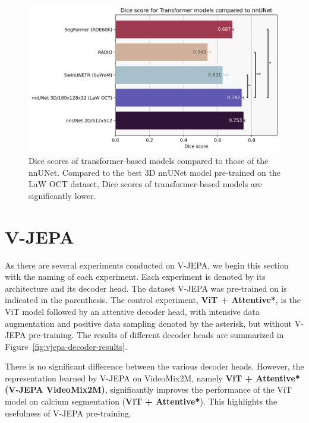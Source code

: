 \documentclass[a4paper,11pt,oneside]{report}
\begin{document}
\begin{figure}[hbt]
    \centering
    \includegraphics[width=0.6\linewidth]{figures/result_nnUNet_vs_Transformer_results.png}
    \caption{Dice scores of transformer-based models compared to those of the nnUNet. Compared to the best 3D nnUNet model pre-trained on the LaW OCT dataset, Dice scores of transformer-based models are significantly lower.}
    \label{fig:transformer-results}
\end{figure}

\section{V-JEPA}
As there are several experiments conducted on V-JEPA, we begin this section with the naming of each experiment. Each experiment is denoted by its architecture and its decoder head. The dataset V-JEPA was pre-trained on is indicated in the parenthesis. The control experiment, \textbf{ViT + Attentive*}, is the ViT model followed by an attentive decoder head, with intensive data augmentation and positive data sampling denoted by the asterisk, but without V-JEPA pre-training. The results of different decoder heads are summarized in Figure~\ref{fig:vjepa-decoder-results}.

There is no significant difference between the various decoder heads. However, the representation learned by V-JEPA on VideoMix2M, namely \textbf{ViT + Attentive* (V-JEPA VideoMix2M)}, significantly improves the performance of the ViT model on calcium segmentation (\textbf{ViT + Attentive*}). This highlights the usefulness of V-JEPA pre-training.
\end{document}
